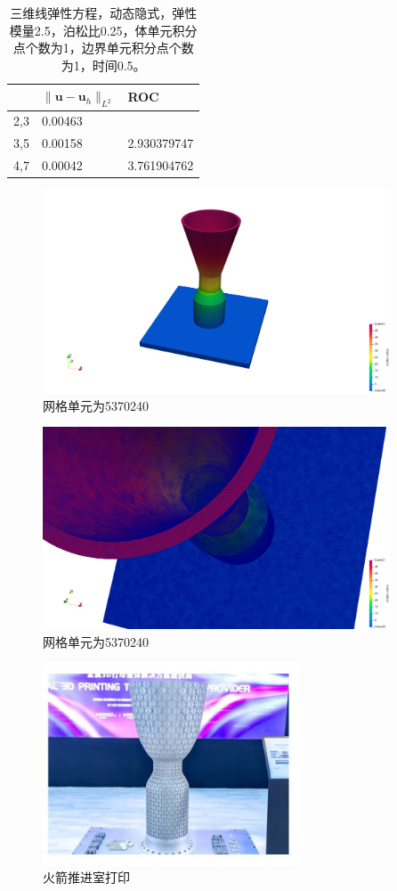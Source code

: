 \begin{table}[!htbp]
  \centering
  \begin{tabular}{c|l|l}
    & $\|\mathbf u-\mathbf u_h\|_{L^2}$ & ROC\\
    \hline
    2,3 & 0.00463 &  \\
    \hline
    3,5 & 0.00158    &  2.930379747\\
    \hline
    4,7 & 0.00042   &     3.761904762
  \end{tabular}
  \caption{三维线弹性方程，动态隐式，弹性模量2.5，泊松比0.25，体单元积分点个数为1，边界单元积分点个数为1，时间0.5。}
\end{table}

\begin{figure}[!htbp]
  \centering
  \includegraphics[height=6cm]{fig/4/4.1.6/engine1.png}
  \caption{网格单元为5370240}
  \label{fig:4.1.3:1}
\end{figure}

\begin{figure}[!htbp]
  \centering
  \includegraphics[height=6cm]{fig/4/4.1.6/engine2.png}
  \caption{网格单元为5370240}
  \label{fig:4.1.3:1}
\end{figure}

\begin{figure}[!htbp]
  \centering
  \includegraphics[height=6cm]{fig/4/4.1.6/engine3.png}
  \caption{火箭推进室打印}
  \label{fig:4.1.3:1}
\end{figure}
